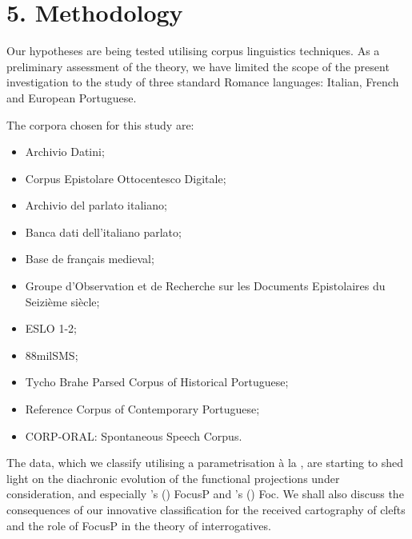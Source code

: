 \documentclass[fleqn,10pt]{wlscirep}
\begin{document}
\section*{5. Methodology}

Our hypotheses are being tested utilising corpus linguistics techniques. 
As a preliminary assessment of the theory, we have limited the scope of the present investigation to the study of three standard Romance languages: Italian, French and European Portuguese. 

The corpora chosen for this study are: 

\begin{itemize}
\item Archivio Datini;
\item \vspace*{-2mm} Corpus Epistolare Ottocentesco Digitale;
\item \vspace*{-2mm} Archivio del parlato italiano;
\item \vspace*{-2mm} Banca dati dell’italiano parlato;
\item \vspace*{-2mm} Base de français medieval;
\item \vspace*{-2mm} Groupe d’Observation et de Recherche sur les Documents Epistolaires du Seizième siècle;
\item \vspace*{-2mm} ESLO 1-2;
\item \vspace*{-2mm} 88milSMS; 
\item \vspace*{-2mm} Tycho Brahe Parsed Corpus of Historical Portuguese;
\item \vspace*{-2mm} Reference Corpus of Contemporary Portuguese;
\item \vspace*{-2mm} CORP-ORAL: Spontaneous Speech Corpus.
\end{itemize}

The data, which we classify utilising a parametrisation à la \citet{rizzi1997fine}, are starting to shed light on the diachronic evolution of the functional projections under consideration, and especially \citeauthor{rizzi1997fine}’s (\citeyear{rizzi1997fine}) FocusP and \citeauthor{belletti2004}’s (\citeyear{belletti2004}) Foc. We shall also discuss the consequences of our innovative classification for the received cartography of clefts and the role of FocusP in the theory of interrogatives. 
\end{document}
